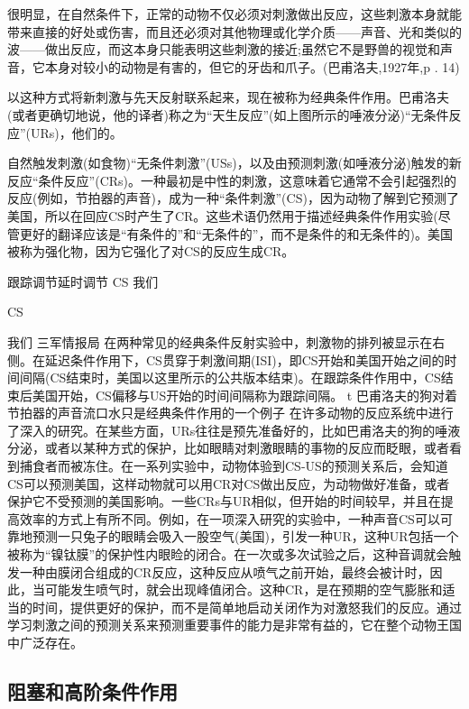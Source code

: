 很明显，在自然条件下，正常的动物不仅必须对刺激做出反应，这些刺激本身就能带来直接的好处或伤害，而且还必须对其他物理或化学介质——声音、光和类似的波——做出反应，而这本身只能表明这些刺激的接近;虽然它不是野兽的视觉和声音，它本身对较小的动物是有害的，但它的牙齿和爪子。(巴甫洛夫,1927年,p . 14)

以这种方式将新刺激与先天反射联系起来，现在被称为经典条件作用。巴甫洛夫(或者更确切地说，他的译者)称之为“天生反应”(如上图所示的唾液分泌)“无条件反应”(URs)，他们的。

自然触发刺激(如食物)“无条件刺激”(USs)，以及由预测刺激(如唾液分泌)触发的新反应“条件反应”(CRs)。一种最初是中性的刺激，这意味着它通常不会引起强烈的反应(例如，节拍器的声音)，成为一种“条件刺激”(CS)，因为动物了解到它预测了美国，所以在回应CS时产生了CR。这些术语仍然用于描述经典条件作用实验(尽管更好的翻译应该是“有条件的”和“无条件的”，而不是条件的和无条件的)。美国被称为强化物，因为它强化了对CS的反应生成CR。

跟踪调节延时调节
CS
我们

CS

我们
三军情报局
在两种常见的经典条件反射实验中，刺激物的排列被显示在右侧。在延迟条件作用下，CS贯穿于刺激间期(ISI)，即CS开始和美国开始之间的时间间隔(CS结束时，美国以这里所示的公共版本结束)。在跟踪条件作用中，CS结束后美国开始，CS偏移与US开始的时间间隔称为跟踪间隔。
t
巴甫洛夫的狗对着节拍器的声音流口水只是经典条件作用的一个例子
在许多动物的反应系统中进行了深入的研究。在某些方面，URs往往是预先准备好的，比如巴甫洛夫的狗的唾液分泌，或者以某种方式的保护，比如眼睛对刺激眼睛的事物的反应而眨眼，或者看到捕食者而被冻住。在一系列实验中，动物体验到CS-US的预测关系后，会知道CS可以预测美国，这样动物就可以用CR对CS做出反应，为动物做好准备，或者保护它不受预测的美国影响。一些CRs与UR相似，但开始的时间较早，并且在提高效率的方式上有所不同。例如，在一项深入研究的实验中，一种声音CS可以可靠地预测一只兔子的眼睛会吸入一股空气(美国)，引发一种UR，这种UR包括一个被称为“镍钛膜”的保护性内眼睑的闭合。在一次或多次试验之后，这种音调就会触发一种由膜闭合组成的CR反应，这种反应从喷气之前开始，最终会被计时，因此，当可能发生喷气时，就会出现峰值闭合。这种CR，是在预期的空气膨胀和适当的时间，提供更好的保护，而不是简单地启动关闭作为对激怒我们的反应。通过学习刺激之间的预测关系来预测重要事件的能力是非常有益的，它在整个动物王国中广泛存在。

\subsection{阻塞和高阶条件作用}


